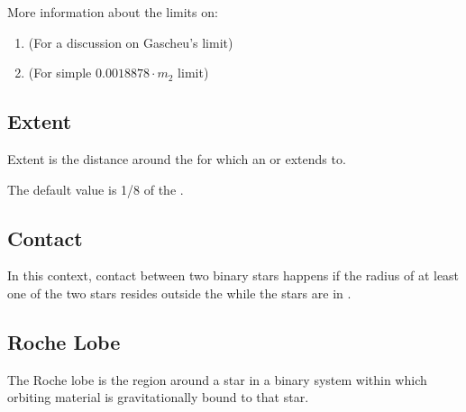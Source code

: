 \documentclass[letterpaper,10pt,english]{sphinxmanual}
\begin{document}
\sphinxAtStartPar
More information about the limits on:
\begin{enumerate}
%
\item {} 
\sphinxAtStartPar
{} (For a discussion on Gascheu’s limit)

\item {} 
\sphinxAtStartPar
{} (For simple \(0.0018878 \cdot m_2\) limit)

\end{enumerate}


\subsection{Extent}
\label{\detokenize{quantities/orbital/extent:extent}}\label{\detokenize{quantities/orbital/extent::doc}}\label{\detokenize{quantities/orbital/extent:id1}}
\sphinxAtStartPar
Extent is the distance around the {\hyperref[\detokenize{quantities/orbital/semi_major_axis:id1}]{}}
for which an {\hyperref[\detokenize{celestial_bodies/asteroid_belt:id1}]{}} or {\hyperref[\detokenize{celestial_bodies/trojan:id1}]{}} extends to.

\sphinxAtStartPar
The default value is 1/8 of the {\hyperref[\detokenize{quantities/orbital/semi_major_axis:id1}]{}}.


\subsection{Contact}
\label{\detokenize{quantities/orbital/contact:contact}}\label{\detokenize{quantities/orbital/contact::doc}}\label{\detokenize{quantities/orbital/contact:id1}}
\sphinxAtStartPar
In this context, contact between two binary stars happens if the radius of at least
one of the two stars resides outside the {\hyperref[\detokenize{quantities/orbital/roche_lobe:id1}]{}} while the stars
are in {\hyperref[\detokenize{quantities/orbital/periapsis:id1}]{}}.


\subsection{Roche Lobe}
\label{\detokenize{quantities/orbital/roche_lobe:roche-lobe}}\label{\detokenize{quantities/orbital/roche_lobe::doc}}\label{\detokenize{quantities/orbital/roche_lobe:id1}}
\sphinxAtStartPar
The Roche lobe is the region around a star in a binary system within which orbiting material is gravitationally bound
to that star.
\end{document}
